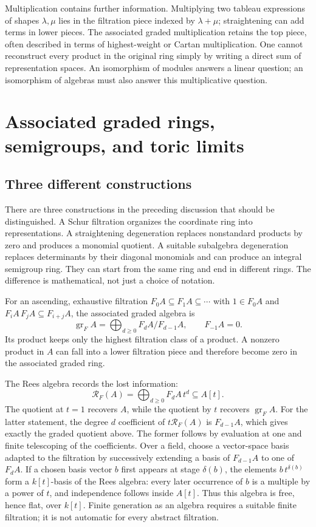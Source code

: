 Multiplication contains further information.
Multiplying two tableau expressions of
shapes \(\lambda,\mu\) lies in the filtration
piece indexed by \(\lambda+\mu\); straightening
can add terms in lower pieces.  The
associated graded multiplication retains
the top piece, often described in terms
of highest-weight or Cartan multiplication.
One cannot reconstruct every product in
the original ring simply by writing a
direct sum of representation spaces.
An isomorphism of modules answers a
linear question; an isomorphism of
algebras must also answer this
multiplicative question.

\chapter{Associated graded rings, semigroups, and toric limits}
\label{chap:filtered-toric}

\section{Three different constructions}

There are three constructions in the preceding discussion
that should be distinguished.  A Schur filtration organizes
the coordinate ring into representations.  A straightening
degeneration replaces nonstandard products by zero and
produces a monomial quotient.  A suitable subalgebra
degeneration replaces determinants by their diagonal
monomials and can produce an integral semigroup ring.
They can start from the same ring and end in different
rings.  The difference is mathematical, not just a
choice of notation.

For an ascending, exhaustive filtration
\(F_0A\subseteq F_1A\subseteq\cdots\) with
\(1\in F_0A\) and \(F_iA\,F_jA\subseteq F_{i+j}A\),
the associated graded algebra is
\[
 \operatorname{gr}_F A
   =\bigoplus_{d\ge0}F_dA/F_{d-1}A,\qquad F_{-1}A=0.
\]
Its product keeps only the highest filtration class
of a product.  A nonzero product in \(A\) can fall
into a lower filtration piece and therefore become
zero in the associated graded ring.

The Rees algebra records the lost information:
\[
 \mathcal R_F(A)=\bigoplus_{d\ge0}F_dA\,t^d
       \subseteq A[t].
\]
The quotient at \(t=1\) recovers \(A\), while the
quotient by \(t\) recovers \(\operatorname{gr}_F A\).
For the latter statement, the degree \(d\)
coefficient of \(t\mathcal R_F(A)\) is
\(F_{d-1}A\), which gives exactly the graded
quotient above.  The former follows by evaluation
at one and finite telescoping of the coefficients.
Over a field, choose a vector-space basis
adapted to the filtration by successively
extending a basis of \(F_{d-1}A\) to one
of \(F_dA\).  If a chosen basis vector
\(b\) first appears at stage \(\delta(b)\),
the elements \(b\,t^{\delta(b)}\) form
a \(k[t]\)-basis of the Rees algebra:
every later occurrence of \(b\) is a
multiple by a power of \(t\), and
independence follows inside \(A[t]\).
Thus this algebra is free, hence flat,
over \(k[t]\).  Finite generation as
an algebra requires a suitable finite
filtration; it is not automatic for
every abstract filtration.

